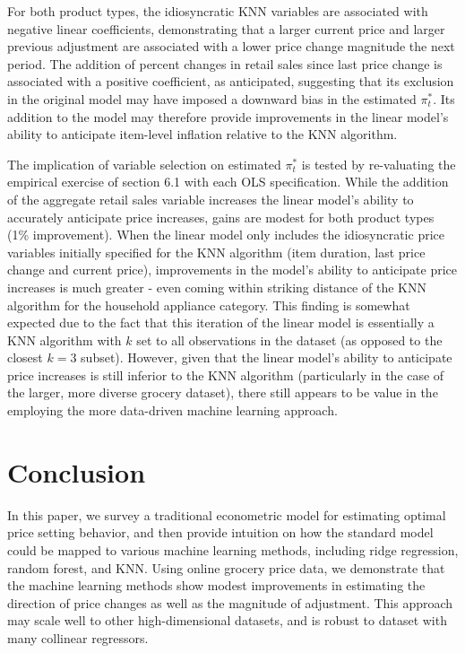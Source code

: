 \documentclass[11pt]{article}
\begin{document}
For both product types, the idiosyncratic KNN variables are associated with negative linear coefficients, demonstrating that a larger current price and larger previous adjustment are associated with a lower price change magnitude the next period. The addition of percent changes in retail sales since last price change is associated with a positive coefficient, as anticipated, suggesting that its exclusion in the original model may have imposed a downward bias in the estimated $\pi_{t}^*$. Its addition to the model may therefore provide improvements in the linear model's ability to anticipate item-level inflation relative to the KNN algorithm. 

The implication of variable selection on estimated $\pi_{t}^*$ is tested by re-valuating the empirical exercise of section 6.1 with each OLS specification. While the addition of the aggregate retail sales variable increases the linear model's ability to accurately anticipate price increases, gains are modest for both product types (1\% improvement). When the linear model only includes the idiosyncratic price variables initially specified for the KNN algorithm (item duration, last price change and current price), improvements in the model's ability to anticipate price increases is much greater - even coming within striking distance of the KNN algorithm for the household appliance category. This finding is somewhat expected due to the fact that this iteration of the linear model is essentially a KNN algorithm with $k$ set to all observations in the dataset (as opposed to the closest $k = 3$ subset). However, given that the linear model's ability to anticipate price increases is still inferior to the KNN algorithm (particularly in the case of the larger, more diverse grocery dataset), there still appears to be value in the employing the more data-driven machine learning approach.     

\section{Conclusion}
In this paper, we survey a traditional econometric model for estimating optimal price setting behavior, and then provide intuition on how the standard model could be mapped to various machine learning methods, including ridge regression, random forest, and KNN. Using online grocery price data, we demonstrate that the machine learning methods show modest improvements in estimating the direction of price changes as well as the magnitude of adjustment. This approach may scale well to other high-dimensional datasets, and is robust to dataset with many collinear regressors. 
\end{document}
